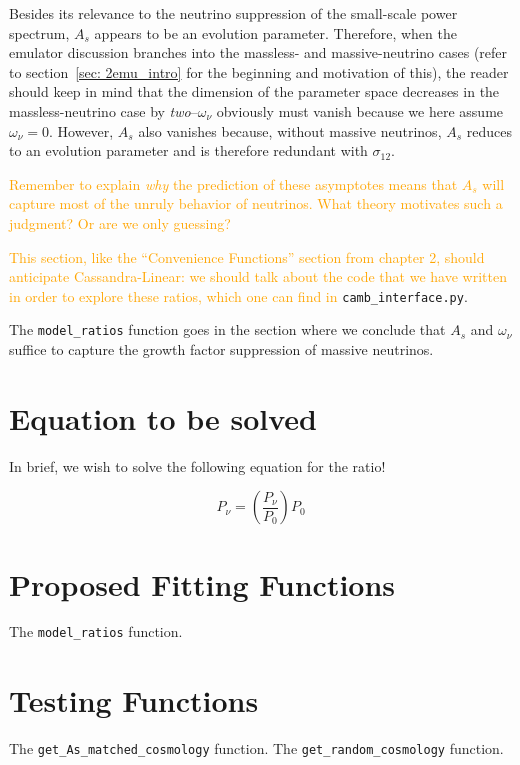 Besides its relevance to the neutrino suppression of the small-scale power
spectrum, $A_s$ appears to be an evolution parameter. Therefore, when the
emulator discussion branches into the massless- and massive-neutrino cases
(refer to section~\ref{sec: 2emu_intro} for the beginning and motivation of
this), the reader should keep in mind that the dimension of the parameter
space decreases in the massless-neutrino case by \textit{two}--$\omega_\nu$ 
obviously must vanish because we here assume $\omega_\nu=0$. However, $A_s$
also vanishes because, without massive neutrinos, $A_s$ reduces to an
evolution parameter and is therefore redundant with $\sigma_{12}$.


\textcolor{orange}{Remember to explain \textit{why} the prediction of these 
asymptotes means that $A_s$ will capture most of the unruly behavior of 
neutrinos. What theory motivates such a judgment? Or are we only guessing?}

\textcolor{orange}{This section, like the ``Convenience Functions'' section
from chapter 2, should anticipate Cassandra-Linear: we should talk about the
code that we have written in order to explore these ratios, which one can find
in} \verb|camb_interface.py|.

The \verb|model_ratios| function goes in the section where we conclude that 
$A_s$ and $\omega_\nu$ suffice to capture the growth factor suppression of 
massive neutrinos.

\section{Equation to be solved}

In brief, we wish to solve the following equation for the ratio!

\begin{equation}
P_\nu = \left( \frac{P_\nu}{P_0} \right) P_0
\end{equation}

\section{Proposed Fitting Functions}

The \verb|model_ratios| function.

\section{Testing Functions}

The \verb|get_As_matched_cosmology| function.
The \verb|get_random_cosmology| function.
